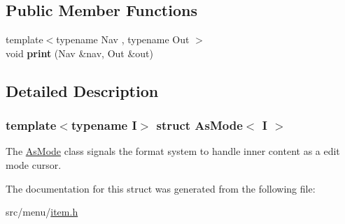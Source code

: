 \subsection*{Public Member Functions}
\begin{DoxyCompactItemize}
\item 
\mbox{\label{structAsMode_a9960667927b41780bf7d9e4aa8bac7bf}} 
{\footnotesize template$<$typename Nav , typename Out $>$ }\\void {\bfseries print} (Nav \&nav, Out \&out)
\end{DoxyCompactItemize}


\subsection{Detailed Description}
\subsubsection*{template$<$typename I$>$\newline
struct As\+Mode$<$ I $>$}

The \hyperlink{structAsMode}{As\+Mode} class signals the format system to handle inner content as a edit mode cursor. 

The documentation for this struct was generated from the following file\+:\begin{DoxyCompactItemize}
\item 
src/menu/\hyperlink{item_8h}{item.\+h}\end{DoxyCompactItemize}
